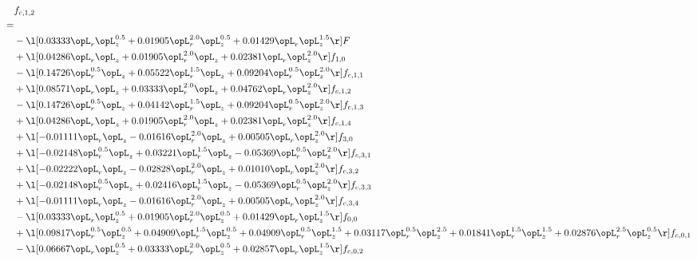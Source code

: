 \begin{alignat}{2} 
\label{eq:f_12_1} 
& f_{c,1,2} \nonumber \\ 
 = \\ 
& - \l[  0.03333 \opL_r \opL_z^{0.5} +  0.01905 \opL_r^{2.0} \opL_z^{0.5} +  0.01429 \opL_r \opL_z^{1.5}  \r] F \nonumber \\ 
& + \l[  0.04286 \opL_r \opL_z +  0.01905 \opL_r^{2.0} \opL_z +  0.02381 \opL_r \opL_z^{2.0}  \r] f_{1,0} \nonumber \\ 
& - \l[  0.14726 \opL_r^{0.5} \opL_z +  0.05522 \opL_r^{1.5} \opL_z +  0.09204 \opL_r^{0.5} \opL_z^{2.0}  \r] f_{c,1,1} \nonumber \\ 
& + \l[  0.08571 \opL_r \opL_z +  0.03333 \opL_r^{2.0} \opL_z +  0.04762 \opL_r \opL_z^{2.0}  \r] f_{c,1,2} \nonumber \\ 
& - \l[  0.14726 \opL_r^{0.5} \opL_z +  0.04142 \opL_r^{1.5} \opL_z +  0.09204 \opL_r^{0.5} \opL_z^{2.0}  \r] f_{c,1,3} \nonumber \\ 
& + \l[  0.04286 \opL_r \opL_z +  0.01905 \opL_r^{2.0} \opL_z +  0.02381 \opL_r \opL_z^{2.0}  \r] f_{c,1,4} \nonumber \\ 
& + \l[  -0.01111 \opL_r \opL_z   -0.01616 \opL_r^{2.0} \opL_z +  0.00505 \opL_r \opL_z^{2.0}  \r] f_{3,0} \nonumber \\ 
& + \l[  -0.02148 \opL_r^{0.5} \opL_z +  0.03221 \opL_r^{1.5} \opL_z   -0.05369 \opL_r^{0.5} \opL_z^{2.0}  \r] f_{c,3,1} \nonumber \\ 
& + \l[  -0.02222 \opL_r \opL_z   -0.02828 \opL_r^{2.0} \opL_z +  0.01010 \opL_r \opL_z^{2.0}  \r] f_{c,3,2} \nonumber \\ 
& + \l[  -0.02148 \opL_r^{0.5} \opL_z +  0.02416 \opL_r^{1.5} \opL_z   -0.05369 \opL_r^{0.5} \opL_z^{2.0}  \r] f_{c,3,3} \nonumber \\ 
& + \l[  -0.01111 \opL_r \opL_z   -0.01616 \opL_r^{2.0} \opL_z +  0.00505 \opL_r \opL_z^{2.0}  \r] f_{c,3,4} \nonumber \\ 
& - \l[  0.03333 \opL_r \opL_z^{0.5} +  0.01905 \opL_r^{2.0} \opL_z^{0.5} +  0.01429 \opL_r \opL_z^{1.5}  \r] f_{0,0} \nonumber \\ 
& + \l[  0.09817 \opL_r^{0.5} \opL_z^{0.5} +  0.04909 \opL_r^{1.5} \opL_z^{0.5} +  0.04909 \opL_r^{0.5} \opL_z^{1.5} +  0.03117 \opL_r^{0.5} \opL_z^{2.5} +  0.01841 \opL_r^{1.5} \opL_z^{1.5} +  0.02876 \opL_r^{2.5} \opL_z^{0.5}  \r] f_{c,0,1} \nonumber \\ 
& - \l[  0.06667 \opL_r \opL_z^{0.5} +  0.03333 \opL_r^{2.0} \opL_z^{0.5} +  0.02857 \opL_r \opL_z^{1.5}  \r] f_{c,0,2} \nonumber \\ 

\end{alignat}
